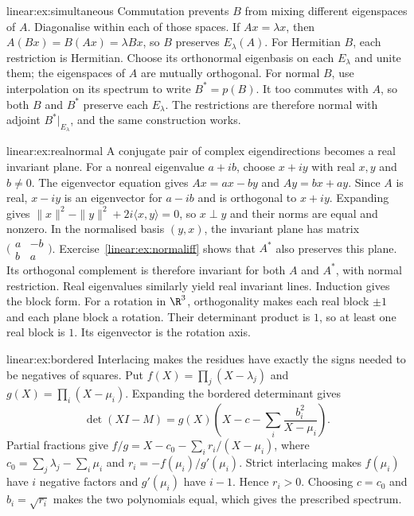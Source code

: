 \begin{solution}{linear:ex:simultaneous}
\idea Commutation prevents $B$ from mixing different eigenspaces of $A$. Diagonalise within each of those spaces.
\writeup If $Ax=\lambda x$, then $A(Bx)=B(Ax)=\lambda Bx$, so $B$ preserves $E_\lambda(A)$. For Hermitian $B$, each restriction is Hermitian. Choose its orthonormal eigenbasis on each $E_\lambda$ and unite them; the eigenspaces of $A$ are mutually orthogonal. For normal $B$, use interpolation on its spectrum to write $B^*=p(B)$. It too commutes with $A$, so both $B$ and $B^*$ preserve each $E_\lambda$. The restrictions are therefore normal with adjoint $B^*|_{E_\lambda}$, and the same construction works.
\end{solution}
\begin{solution}{linear:ex:realnormal}
\idea A conjugate pair of complex eigendirections becomes a real invariant plane.
\writeup For a nonreal eigenvalue $a+ib$, choose $x+iy$ with real $x,y$ and $b\ne0$. The eigenvector equation gives $Ax=ax-by$ and $Ay=bx+ay$. Since $A$ is real, $x-iy$ is an eigenvector for $a-ib$ and is orthogonal to $x+iy$. Expanding gives $\|x\|^2-\|y\|^2+2i\langle x,y\rangle=0$, so $x\perp y$ and their norms are equal and nonzero. In the normalised basis $(y,x)$, the invariant plane has matrix $\bigl(\begin{smallmatrix}a&-b\\b&a\end{smallmatrix}\bigr)$. Exercise~\ref{linear:ex:normaliff} shows that $A^*$ also preserves this plane. Its orthogonal complement is therefore invariant for both $A$ and $A^*$, with normal restriction. Real eigenvalues similarly yield real invariant lines. Induction gives the block form. For a rotation in $\R^3$, orthogonality makes each real block $\pm1$ and each plane block a rotation. Their determinant product is $1$, so at least one real block is $1$. Its eigenvector is the rotation axis.
\end{solution}
\begin{solution}{linear:ex:bordered}
\idea Interlacing makes the residues have exactly the signs needed to be negatives of squares.
\writeup Put $f(X)=\prod_j(X-\lambda_j)$ and $g(X)=\prod_i(X-\mu_i)$. Expanding the bordered determinant gives
\[\det(XI-M)=g(X)\left(X-c-\sum_i\frac{b_i^2}{X-\mu_i}\right).\]
Partial fractions give $f/g=X-c_0-\sum_i r_i/(X-\mu_i)$, where $c_0=\sum_j\lambda_j-\sum_i\mu_i$ and $r_i=-f(\mu_i)/g'(\mu_i)$. Strict interlacing makes $f(\mu_i)$ have $i$ negative factors and $g'(\mu_i)$ have $i-1$. Hence $r_i>0$. Choosing $c=c_0$ and $b_i=\sqrt{r_i}$ makes the two polynomials equal, which gives the prescribed spectrum.
\end{solution}
